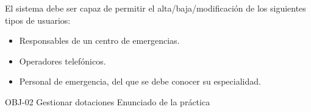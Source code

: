 {\reportauthors}
{El sistema debe ser capaz de permitir el alta/baja/modificación de los siguientes tipos de usuarios: \par
\begin{itemize}[noitemsep, nolistsep]
    \item Responsables de un centro de emergencias.
    \item Operadores telefónicos.
    \item Personal de emergencia, del que se debe conocer su especialidad.
\end{itemize}}
{OBJ-02 Gestionar dotaciones}
{Enunciado de la práctica}

